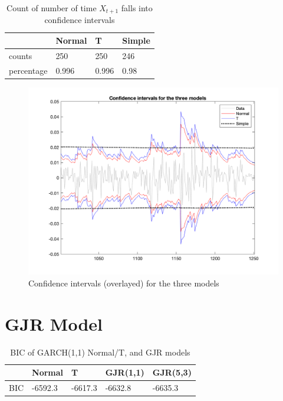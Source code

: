 \documentclass{article}
\begin{document}
\begin{table}[H]
  \centering
\begin{tabular}{l | lll}
& Normal & T & Simple\\ \hline
counts & 250  & 250 & 246 \\
percentage & 0.996 & 0.996 & 0.98   \\
\end{tabular}

\caption{Count of number of time $X_{t+1}$ falls into confidence intervals}
\label{tab:ci_counts}
\end{table}

\begin{figure}[H]
\includegraphics[width=16cm]{plots/conf_ints_overlay.png}
\centering
\caption{Confidence intervals (overlayed) for the three models}
\label{fig:conf_intervals}
\end{figure}

\section*{GJR Model}

\begin{table}[H]
  \centering
\begin{tabular}{l | l l l l}
& Normal & T & GJR(1,1) & GJR(5,3)\\ \hline
BIC & -6592.3 & -6617.3 & -6632.8 & -6635.3 \\
\end{tabular}
\caption{BIC of GARCH(1,1) Normal/T, and GJR models}
\label{tab:bic_compare}
\end{table}
\end{document}
